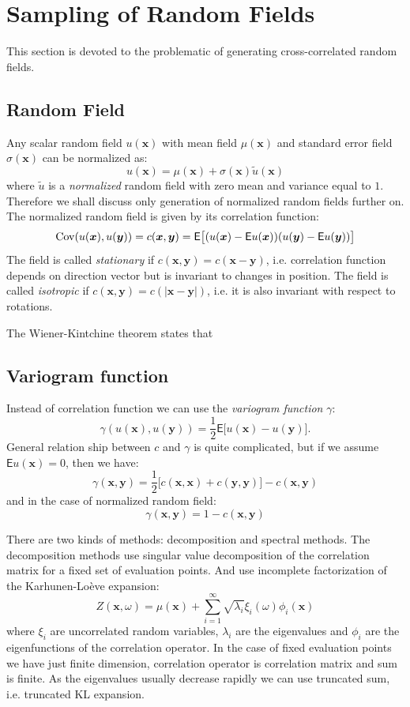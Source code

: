 \documentclass{article}
\def\vc#1{\mathbf{\boldsymbol{#1}}}     %
\def \E{{\mathsf E}}
\begin{document}
\section{Sampling  of Random Fields}
This section is devoted to the problematic of generating cross-correlated random fields.

\subsection{Random Field}
Any scalar random field $u(\vc x)$ with mean field $\mu(\vc x)$ and standard error
field $\sigma(\vc x)$ can be normalized as:
\[
    u(\vc x) = \mu(\vc x) + \sigma(\vc x) \tilde{u}(\vc x)
\]
where $\tilde{u}$ is a \emph{normalized} random field with zero mean and variance equal to $1$. Therefore we shall discuss only generation of normalized random fields further on. The normalized random field is given by its correlation function:
\[
    {\rm Cov}(u(\vc x), u(\vc y) ) = c(\vc x, \vc y)  
    = \E\big[ (u(\vc x) - \E u(\vc x))(u(\vc y) - \E u(\vc y)) \big]
\]
The field is called \emph{stationary} if $c(\vc x, \vc y) = c(\vc x - \vc y)$, i.e. 
correlation function depends on direction vector but is invariant to changes in position. The field is called \emph{isotropic} if $c(\vc x, \vc y) = c(|\vc x - \vc y|)$, i.e. it is also invariant with respect to rotations. 

The Wiener-Kintchine theorem states that
\cite{}

\subsection{Variogram function}
Instead of correlation function we can use the \emph{variogram function} $\gamma$:
\[
    \gamma(u(\vc x), u(\vc y)) = \frac12 \E\big[u(\vc x) - u(\vc y)\big].
\]
General relation ship between $c$ and $\gamma$ is quite complicated, but if we assume $\E u(\vc x) = 0$, then
we have:
\[
    \gamma(\vc x, \vc y) = \frac12 \big[ c(\vc x, \vc x) + c(\vc y, \vc y)\big] - c(\vc x, \vc y)
\]
and in the case of normalized random field:
\[
    \gamma(\vc x, \vc y) = 1 - c(\vc x, \vc y)
\]


There are two kinds of methods: decomposition and spectral methods. The decomposition methods use singular value decomposition of the correlation matrix for a fixed set of evaluation points. And use incomplete factorization of the Karhunen-Lo\`eve expansion:
\[
    Z(\vc x, \omega) = \mu(\vc x) +  \sum_{i = 1}^\infty \sqrt{\lambda_i} \xi_i(\omega) \phi_i(\vc x)
\]
where  $\xi_i$ are uncorrelated random variables, $\lambda_i$ are the eigenvalues and  $\phi_i$ are 
the eigenfunctions of the correlation operator. In the case of fixed evaluation points we have just finite
dimension, correlation operator is correlation matrix and sum is finite. As the eigenvalues usually decrease
rapidly we can use truncated sum, i.e. truncated KL expansion.
\end{document}
